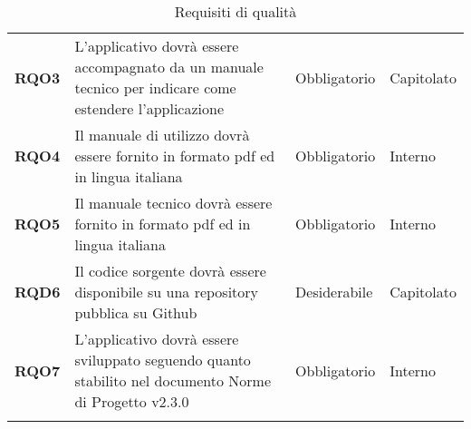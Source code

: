 \begin{longtable}[H]{| >{\raggedright\bfseries}m{20mm} | >{\raggedright}m{90mm} | >{\centering}m{25mm} | >{\centering\arraybackslash}m{30mm}|}
    RQO3
     & L'applicativo dovrà essere accompagnato da un manuale tecnico per indicare come estendere l'applicazione
     & Obbligatorio
     & Capitolato                                                                                                           \\

    RQO4
     & Il manuale di utilizzo dovrà essere fornito in formato pdf ed in lingua italiana
     & Obbligatorio
     & Interno                                                                                                              \\

    RQO5
     & Il manuale tecnico dovrà essere fornito in formato pdf ed in lingua italiana
     & Obbligatorio
     & Interno                                                                                                              \\

    RQD6
     & Il codice sorgente dovrà essere disponibile su una repository pubblica su Github
     & Desiderabile
     & Capitolato                                                                                                           \\

    RQO7
     & L'applicativo dovrà essere sviluppato seguendo quanto stabilito nel documento Norme di Progetto v2.3.0
     & Obbligatorio
     & Interno                                                                                                              \\
    \hline
    \rowcolor{white}
    \caption{Requisiti di qualità}%
    \label{tab:requisiti_di_qualita}
\end{longtable}
